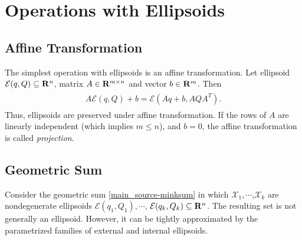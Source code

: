 \documentclass[letterpaper,10pt,english]{sphinxmanual}
\begin{document}
\section{Operations with Ellipsoids}
\label{main_source:operations-with-ellipsoids}

\subsection{Affine Transformation}
\label{main_source:affine-transformation}
The simplest operation with ellipsoids is an affine transformation. Let
ellipsoid ${\mathcal E}(q,Q)\subseteq{\bf R}^n$, matrix
$A\in{\bf R}^{m\times n}$ and vector $b\in{\bf R}^m$. Then
\label{main_source:equation-affinetrans}\begin{gather}
\begin{split}A{\mathcal E}(q,Q) + b = {\mathcal E}(Aq+b, AQA^T) .\end{split}\label{main_source-affinetrans}
\end{gather}
Thus, ellipsoids are preserved under affine transformation. If the rows
of $A$ are linearly independent (which implies
$m\leqslant n$), and $b=0$, the affine transformation is
called \emph{projection}.


\subsection{Geometric Sum}
\label{main_source:geometric-sum}
Consider the geometric sum \eqref{main_source-minksum} in which
${\mathcal X}_1,\cdots$,${\mathcal X}_k$ are nondegenerate
ellipsoids ${\mathcal E}(q_1,Q_1),\cdots$,
${\mathcal E}(q_k,Q_k)\subseteq{\bf R}^n$. The resulting set is
not generally an ellipsoid. However, it can be tightly approximated by
the parametrized families of external and internal ellipsoids.
\end{document}
